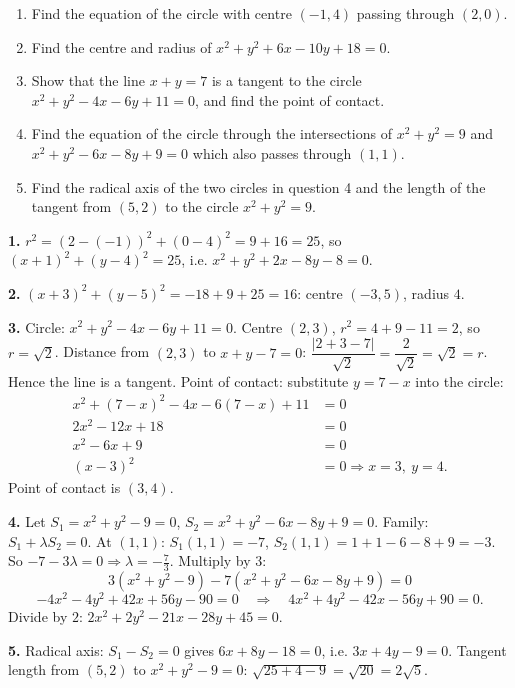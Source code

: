 \documentclass[11pt]{article}
\begin{document}
\begin{exercice}
\begin{enumerate}
\item Find the equation of the circle with centre $(-1,4)$ passing through $(2,0)$.
\item Find the centre and radius of $x^2+y^2+6x-10y+18=0$.
\item Show that the line $x+y=7$ is a tangent to the circle $x^2+y^2-4x-6y+11=0$, and find the point of contact.
\item Find the equation of the circle through the intersections of $x^2+y^2=9$ and $x^2+y^2-6x-8y+9=0$ which also passes through $(1,1)$.
\item Find the radical axis of the two circles in question 4 and the length of the tangent from $(5,2)$ to the circle $x^2+y^2=9$.
\end{enumerate}
\end{exercice}

\begin{corrige}
\textbf{1.} $r^2=(2-(-1))^2+(0-4)^2=9+16=25$, so $(x+1)^2+(y-4)^2=25$, i.e. $x^2+y^2+2x-8y-8=0$.

\textbf{2.} $(x+3)^2+(y-5)^2=-18+9+25=16$: centre $(-3,5)$, radius $4$.

\textbf{3.} Circle: $x^2+y^2-4x-6y+11=0$. Centre $(2,3)$, $r^2=4+9-11=2$, so $r=\sqrt2$. Distance from $(2,3)$ to $x+y-7=0$: $\dfrac{|2+3-7|}{\sqrt2}=\dfrac{2}{\sqrt2}=\sqrt2 = r$. Hence the line is a tangent. Point of contact: substitute $y=7-x$ into the circle:
\begin{align*}
x^2+(7-x)^2-4x-6(7-x)+11&=0\\
2x^2-12x+18&=0\\
x^2-6x+9&=0\\
(x-3)^2&=0 \Rightarrow x=3,\ y=4.
\end{align*}
Point of contact is $(3,4)$.

\textbf{4.} Let $S_1=x^2+y^2-9=0$, $S_2=x^2+y^2-6x-8y+9=0$. Family: $S_1+\lambda S_2=0$. At $(1,1)$: $S_1(1,1)=-7$, $S_2(1,1)=1+1-6-8+9=-3$. So $-7-3\lambda=0 \Rightarrow \lambda=-\frac73$. Multiply by $3$:
\[
3(x^2+y^2-9)-7(x^2+y^2-6x-8y+9)=0
\]
\[
-4x^2-4y^2+42x+56y-90=0 \quad\Rightarrow\quad 4x^2+4y^2-42x-56y+90=0.
\]
Divide by $2$: $2x^2+2y^2-21x-28y+45=0$.

\textbf{5.} Radical axis: $S_1-S_2=0$ gives $6x+8y-18=0$, i.e. $3x+4y-9=0$. Tangent length from $(5,2)$ to $x^2+y^2-9=0$: $\sqrt{25+4-9}=\sqrt{20}=2\sqrt5$.
\end{corrige}
\end{document}
